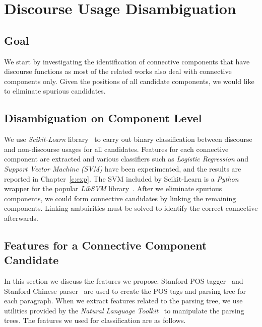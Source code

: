 

\section{Discourse Usage Disambiguation}
\label{c:discourse-disambig}

\subsection{Goal}

We start by investigating the identification of connective components that have discourse functions
as most of the related works also deal with connective components only.
Given the positions of all candidate components, we would like to eliminate spurious candidates.

\subsection{Disambiguation on Component Level}
\label{c:discourse-disambig-component}


We use \textit{Scikit-Learn} library~\citep{scikit-learn} to carry out binary
classification between discourse and non-discourse usages for all candidates.
Features for each connective component are extracted and various
classifiers such as \textit{Logistic Regression} and
\textit{Support Vector Machine (SVM)} have been experimented, and the results
are reported in Chapter~\ref{c:exp}. The SVM included by Scikit-Learn is
a \textit{Python} wrapper for the popular \textit{LibSVM} library~\citep{CC01a}.
After we eliminate spurious components, we could form connective candidates
by linking the remaining components. Linking ambuirities must be solved to
identify the correct connective afterwards.


\subsection{Features for a Connective Component Candidate}
\label{s:comp-features}

In this section we discuss the features we propose.
Stanford POS tagger~\citep{toutanova2003feature} and Stanford Chinese
parser~\citep{levy2003harder} are used to create the POS tags and parsing tree
for each paragraph. When we extract features related to the parsing tree, we use
utilities provided by the \textit{Natural Language Toolkit}~\citep{BirdKleinLoper09}
to manipulate the parsing trees. The features we used for classification
are as follows.

